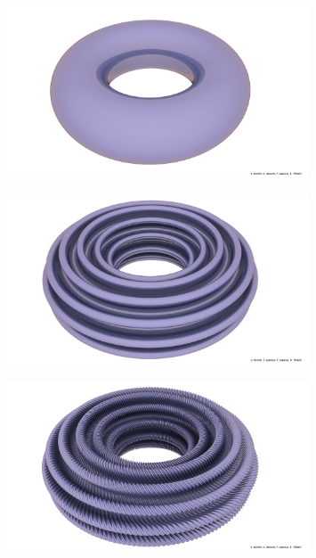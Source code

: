\documentclass[10pt]{beamer}
\begin{document}
\begin{frame}

    \begin{figure}
        \centering
        \includegraphics[width=0.8\textwidth]{0corrugation.jpg} %
    \end{figure}
    
\end{frame}
\begin{frame}

    \begin{figure}
        \centering
        \includegraphics[width=0.8\textwidth]{1corrugation.jpg} %
    \end{figure}
    
\end{frame}
\begin{frame}

    \begin{figure}
        \centering
        \includegraphics[width=0.8\textwidth]{2corrugations.jpg} %
    \end{figure}
    
\end{frame}
\end{document}
